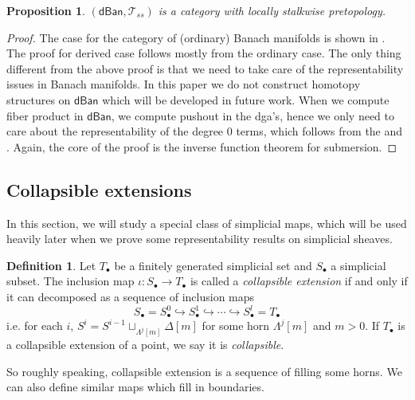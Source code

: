\documentclass[12pt]{amsart}
\newtheorem{prop}[thm]{Proposition}
\theoremstyle{definition}
\newtheorem{defn}[thm]{Definition}
\theoremstyle{remark}
\numberwithin{equation}{section}
\newcommand{\1}{{\mathbb{1}}}
\newcommand{\dm}{\mathsf{dM}}
\newcommand{\dban}{\mathsf{dBan}}
\newcommand{\bt}{\bullet}
\begin{document}
	\begin{prop}
	$(\dban,\mathcal{T}_{ss})$ is a category with locally stalkwise pretopology.
\end{prop}
\begin{proof}
    The case for the category of (ordinary) Banach manifolds is shown in \cite[Proposition 6.12]{RZ20}. The proof for derived case follows mostly from the ordinary case. The only thing different from the above proof is that we need to take care of the representability issues in Banach manifolds. In this paper we do not construct homotopy structures on $\dban$ which will be developed in future work. When we compute fiber product in $\dban$, we compute pushout in the dga's, hence we only need to care about the representability of the degree 0 terms, which follows from the \cite[Lemma 6.9]{RZ20} and \cite[Lemma 6.11]{RZ20}. Again, the core of the proof is the inverse function theorem for submersion.
\end{proof}




\subsection{Collapsible extensions }
In this section, we will study a special class of simplicial maps, which will be used heavily later when we prove some representability results on simplicial sheaves.

\begin{defn}
    Let $T_{\bt}$ be a finitely generated simplicial set and $S_{\bt}$ a simplicial subset.  The inclusion map $\iota: S_{\bt} \to T_{\bt}$ is called a {\it collapsible extension} if and only if it can decomposed as a sequence of inclusion  maps
    \begin{equation*}
        S_{\bullet} = S^0_{\bt} \hookrightarrow
        S^1_{\bt} \hookrightarrow \cdots \hookrightarrow S^l_{\bt} = T_{\bt}
    \end{equation*}
    i.e. for each $i$, $S^i = S^{i-1}\sqcup_{\Lambda^j[m]} \Delta[m]$ for some horn $\Lambda^j[m]$ and $m>0$. If $T_{\bt}$ is a collapsible extension of a point, we say it is {\it collapsible}.
\end{defn}
So roughly speaking, collapsible extension is a sequence of filling some horns. We can also define similar maps which fill in boundaries.
\end{document}
